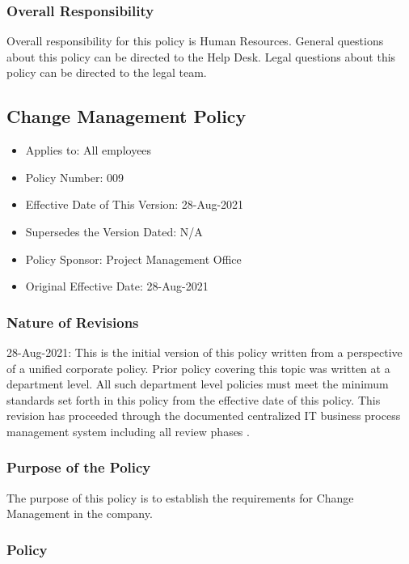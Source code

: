 \documentclass[stu]{apa7}
\begin{document}
\subsubsection{Overall Responsibility}
\label{sec:org17f3dfb}

Overall responsibility for this policy is Human Resources. General questions about this policy can be directed to the Help Desk. Legal questions about this policy can be directed to the legal team.

\subsection{Change Management Policy}
\label{sec:org247fb9a}

\begin{itemize}
\item Applies to: All employees
\item Policy Number: 009
\item Effective Date of This Version: 28-Aug-2021
\item Supersedes the Version Dated: N/A
\item Policy Sponsor: Project Management Office
\item Original Effective Date: 28-Aug-2021
\end{itemize}

\subsubsection{Nature of Revisions}
\label{sec:org348a638}

28-Aug-2021: This is the initial version of this policy written from a perspective of a unified corporate policy. Prior policy covering this topic was written at a department level. All such department level policies must meet the minimum standards set forth in this policy from the effective date of this policy. This revision has proceeded through the documented centralized IT business process management system including all review phases \cite{wagleDevelopmentEffectiveCentralized2021}.

\subsubsection{Purpose of the Policy}
\label{sec:org2b19379}

The purpose of this policy is to establish the requirements for Change Management in the company.


\subsubsection{Policy}
\label{sec:org4c6aa5a}
\end{document}

